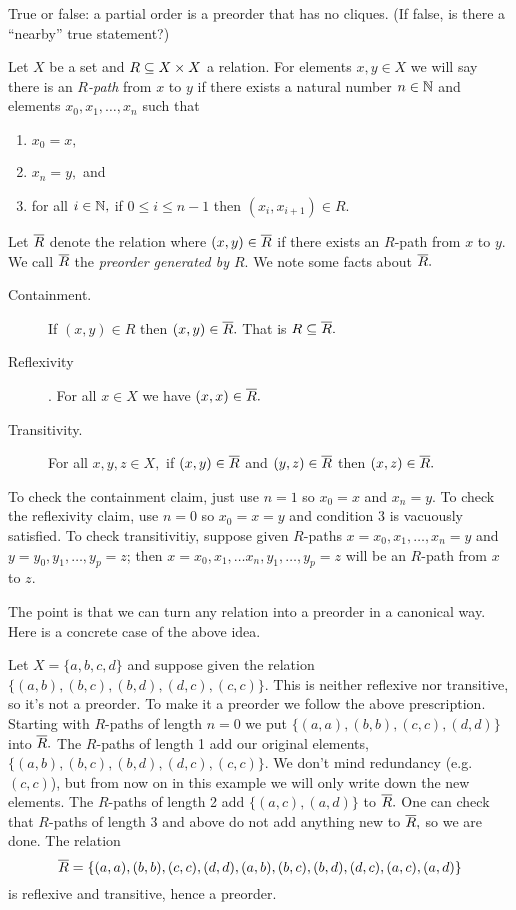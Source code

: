 \documentclass[CT4S-EN-RU]{subfiles}
\begin{document}
\begin{exerciseENG}
True or false: a partial order is a preorder that has no cliques. (If false, is there a “nearby” true statement?)
\end{exerciseENG}

\begin{exerciseRUS}
\end{exerciseRUS}

\begin{exampleENG}\label{ex:preorder generated}
Let $X$ be a set and $R\ss X\times X$ a relation. For elements $x,y\in X$ we will say there is an {\em $R$-path} from $x$ to $y$ if there exists a natural number $n\in\NN$ and elements $x_0,x_1,\ldots,x_n$ such that
\begin{enumerate}
\item $x_0=x,$
\item $x_n=y,$ and
\item for all $i\in\NN,$ if $0\leq i\leq n-1$ then $(x_i,x_{i+1})\in R.$
\end{enumerate}
Let $\ol{R}$ denote the relation where $(x,y)\in\ol{R}$ if there exists an $R$-path from $x$ to $y.$ We call $\ol{R}$ the {\em preorder generated by $R.$} We note some facts about $\ol{R}.$
\begin{description}
\item[Containment.] If $(x,y)\in R$ then $(x,y)\in\ol{R}.$ That is $R\ss\ol{R}.$
\item[Reflexivity]. For all $x\in X$ we have $(x,x)\in\ol{R}.$ 
\item[Transitivity.] For all $x,y,z\in X,$ if $(x,y)\in\ol{R}$ and $(y,z)\in\ol{R}$ then $(x,z)\in\ol{R}.$
\end{description}
To check the containment claim, just use $n=1$ so $x_0=x$ and $x_n=y.$ To check the reflexivity claim, use $n=0$ so $x_0=x=y$ and condition 3 is vacuously satisfied. To check transitivitiy, suppose given $R$-paths $x=x_0,x_1,\ldots,x_n=y$ and $y=y_0,y_1,\ldots,y_p=z$; then $x=x_0,x_1,\ldots x_n,y_1,\ldots,y_p=z$ will be an $R$-path from $x$ to $z.$

The point is that we can turn any relation into a preorder in a canonical way. Here is a concrete case of the above idea.

Let $X=\{a,b,c,d\}$ and suppose given the relation $\{(a,b),(b,c),(b,d),(d,c),(c,c)\}.$ This is neither reflexive nor transitive, so it's not a preorder. To make it a preorder we follow the above prescription. Starting with $R$-paths of length $n=0$ we put  $\{(a,a), (b,b), (c,c), (d,d)\}$ into $\ol{R}.$ The $R$-paths of length 1 add our original elements, $\{(a,b),(b,c),(b,d),(d,c),(c,c)\}.$ We don't mind redundancy (e.g. $(c,c)$), but from now on in this example we will only write down the new elements. The $R$-paths of length 2 add $\{(a,c),(a,d)\}$ to $\ol{R}.$ One can check that $R$-paths of length 3 and above do not add anything new to $\ol{R},$ so we are done. The relation $$\ol{R}=\{(a,a), (b,b), (c,c), (d,d), (a,b), (b,c), (b,d), (d,c), (a,c), (a,d)\}$$ is reflexive and transitive, hence a preorder.
\end{exampleENG}
\end{document}
